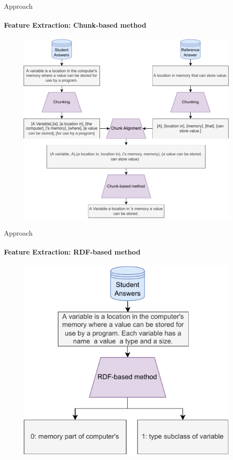 \documentclass[aspectratio=169]{beamer}
\begin{document}
\begin{frame}{Approach}
\framesubtitle{Feature Extraction: Chunk-based method}
\begin{figure}
\centering
\includegraphics[scale = 0.5]{images/chunk_FE.pdf}
\label{fig:chunk fe}
\end{figure}
\end{frame}
\begin{frame}{Approach}
\framesubtitle{Feature Extraction: RDF-based method}
\begin{figure}
\centering
\includegraphics[scale = 0.65]{images/RDF_FE.pdf}
\label{fig:rdf fe}
\end{figure}
\end{frame}
\end{document}
